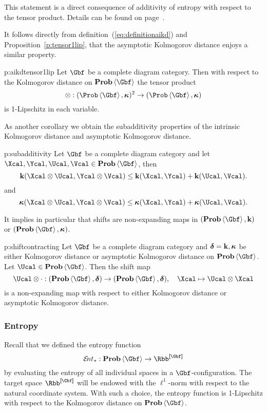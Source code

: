 This statement is a direct consequence of additivity of entropy with
respect to the tensor product. Details can be found on
page~\pageref{p:tensor1lip.rep}.

It follows directly from definition~(\ref{eq:definitionaikd}) and
Proposition~\ref{p:tensor1lip}, that the asymptotic Kolmogorov distance
enjoys a similar property.
\begin{corollary}{p:aikdtensor1lip}
  Let $\Gbf$ be a complete diagram category.
  Then with respect to the Kolmogorov distance on $\prob\<\Gbf>$
  the tensor product
  \[
  \otimes:(\Prob\<\Gbf>,\aikd)^2\to(\Prob\<\Gbf>,\aikd)
  \]
  is 1-Lipschitz in each variable.
\end{corollary}

As another corollary we obtain the subadditivity properties of the intrinsic
Kolmogorov distance and asymptotic Kolmogorov distance.

\begin{corollary}{p:subadditivity}
  Let $\Gbf$ be a complete diagram category and let $\Xcal, \Ycal,
  \Ucal, \Vcal \in \prob\<\Gbf>$, then
  \[
  \ikd(\Xcal \otimes \Ucal, \Ycal \otimes \Vcal)
  \leq \ikd(\Xcal, \Ycal) + \ikd( \Ucal, \Vcal ).
  \]	
  and 
  \[
  \aikd(\Xcal \otimes \Ucal, \Ycal \otimes \Vcal)
  \leq 
  \aikd(\Xcal, \Ycal) + \aikd( \Ucal, \Vcal ).
  \]	
\end{corollary}

It implies in particular that shifts are non-expanding maps in
$(\prob\<\Gbf>,\ikd)$ or $(\prob\<\Gbf>,\aikd)$. 
\begin{corollary}{p:shiftcontracting}
  Let $\Gbf$ be a complete diagram category and $\operatorname{{\bm\delta}}=\operatorname{\mathbf{k}},\operatorname{{\bm\kappa}}$ be
  either Kolmogorov distance or asymptotic Kolmogorov distance on
  $\prob\<\Gbf>$. Let
  $\Ucal\in\prob\<\Gbf>$. Then the shift map
  \[
  \Ucal\otimes\cdot:(\prob\<\Gbf>,\dist)\to(\prob\<\Gbf>,\dist),
  \quad
  \Xcal\mapsto \Ucal\otimes\Xcal
  \]
  is a non-expanding map with respect to either Kolmogorov distance or
  asymptotic Kolmogorov distance.
\end{corollary}

\subsubsection{Entropy}\label{s:kolmogorov-lipschitz-entropy}
Recall that we defined the entropy function 
\[
\ent_{*}:\prob\<\Gbf>\to\Rbb^{\size{\Gbf}}
\]
by evaluating the entropy of all individual spaces in a
$\Gbf$-configuration. The target space $\Rbb^{\size{\Gbf}}$ will be
endowed with the $\ell^{1}$-norm with respect to the natural coordinate
system. With such a choice, the entropy function is 1-Lipschitz with
respect to the Kolmogorov distance on $\prob\<\Gbf>$.


